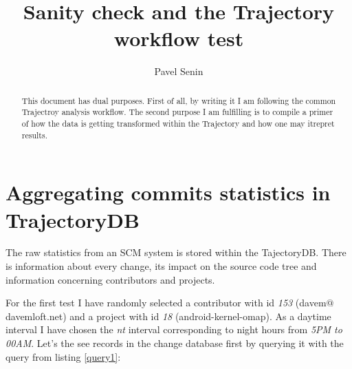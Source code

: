 \documentclass[a4paper,10pt]{article}
\title{Sanity check and the Trajectory workflow test}
\author{Pavel Senin}
\numberwithin{equation}{subsection}
\begin{document}
\maketitle

\begin{abstract}
This document has dual purposes. First of all, by writing it I am following the common Trajectroy analysis workflow. 
The second purpose I am fulfilling is to compile a primer of how the data is getting transformed within the Trajectory and
how one may itrepret results.
\end{abstract}

\section{Aggregating commits statistics in TrajectoryDB}
The raw statistics from an SCM system is stored within the TajectoryDB. There is information about every change, its impact
on the source code tree and information concerning contributors and projects.

For the first test I have randomly selected a contributor with id \emph{153} (davem$@$davemloft.net) and a project with id 
\emph{18} (android-kernel-omap). 
As a daytime interval I have chosen the \emph{nt} interval corresponding to night hours from \emph{5PM to 00AM}. 
Let's the see records in the change database first by querying it with the query from listing \ref{query1}:
\end{document}
